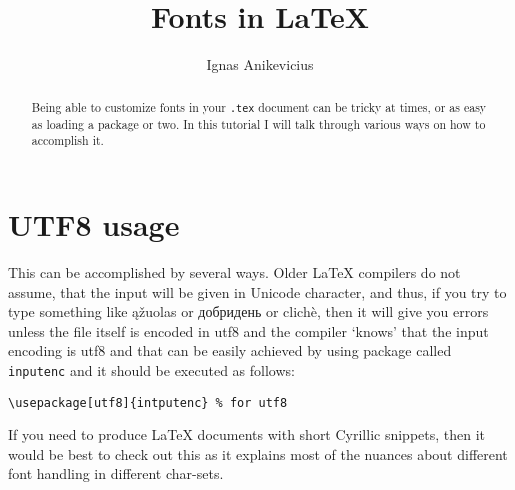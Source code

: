 

\newcommand\cyrtext[1]{{\fontencoding{T2A}\selectfont #1}}

\def\reflect#1{{\setbox0=\hbox{#1}\rlap{\kern0.5\wd0
  \special{x:gsave}\special{x:scale -1 1}}\box0 \special{x:grestore}}}
\def\XeTeX{\leavevmode
  \setbox0=\hbox{X\lower.5ex\hbox{\kern-.15em\reflect{E}}\kern-.1667em \TeX}%
  \dp0=0pt\ht0=0pt\box0 }

\title{Fonts in \LaTeX{}}
\author{Ignas Anikevicius}



\maketitle

\begin{abstract}
    Being able to customize fonts in your \verb|.tex| document can be tricky at
    times, or as easy as loading a package or two. In this tutorial I will talk
    through various ways on how to accomplish it.
\end{abstract}

\tableofcontents

\section{UTF8 usage}

This can be accomplished by several ways. Older \LaTeX{} compilers do not
assume, that the input will be given in Unicode character, and thus, if you try
to type something like 
ąžuolas or 
\cyrtext{добридень} or 
clichè, then it will give you
errors unless the file itself is encoded in utf8 and the compiler `knows' that
the input encoding is utf8 and that can be easily achieved by using package
called \verb|inputenc| and it should be executed as follows:
\begin{lstlisting}
\usepackage[utf8]{intputenc} % for utf8
\end{lstlisting}

If you need to produce \LaTeX{} documents with short Cyrillic snippets, then it
would be best to check out this
as it explains most of the nuances about different font handling in different
char-sets.


